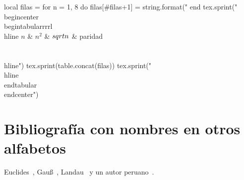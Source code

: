 \begin{luacode*}
  local filas = {}
  for n = 1, 8 do
    filas[#filas+1] = string.format("%
  end
  tex.sprint("\\begin{center}\\begin{tabular}{rrrl}\\hline $n$ & $n^2$ & $\\sqrt n$ & paridad\\\\\\hline")
  tex.sprint(table.concat(filas))
  tex.sprint("\\hline\\end{tabular}\\end{center}")
\end{luacode*}

\section{Bibliografía con nombres en otros alfabetos}
Euclides~\cite{euclides}, Gauß~\cite{gauss}, Landau~\cite{landau} y un autor peruano~\cite{nuñez}.
\printbibliography

